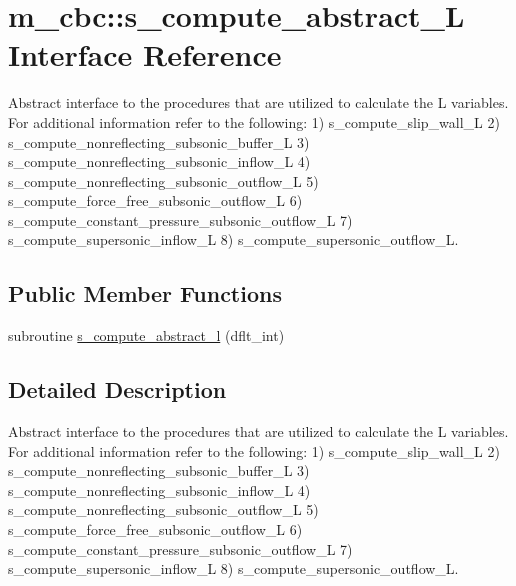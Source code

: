 \hypertarget{interfacem__cbc_1_1s__compute__abstract___l}{}\section{m\+\_\+cbc\+:\+:s\+\_\+compute\+\_\+abstract\+\_\+L Interface Reference}
\label{interfacem__cbc_1_1s__compute__abstract___l}


Abstract interface to the procedures that are utilized to calculate the L variables. For additional information refer to the following\+: 1) s\+\_\+compute\+\_\+slip\+\_\+wall\+\_\+L 2) s\+\_\+compute\+\_\+nonreflecting\+\_\+subsonic\+\_\+buffer\+\_\+L 3) s\+\_\+compute\+\_\+nonreflecting\+\_\+subsonic\+\_\+inflow\+\_\+L 4) s\+\_\+compute\+\_\+nonreflecting\+\_\+subsonic\+\_\+outflow\+\_\+L 5) s\+\_\+compute\+\_\+force\+\_\+free\+\_\+subsonic\+\_\+outflow\+\_\+L 6) s\+\_\+compute\+\_\+constant\+\_\+pressure\+\_\+subsonic\+\_\+outflow\+\_\+L 7) s\+\_\+compute\+\_\+supersonic\+\_\+inflow\+\_\+L 8) s\+\_\+compute\+\_\+supersonic\+\_\+outflow\+\_\+L.  


\subsection*{Public Member Functions}
\begin{DoxyCompactItemize}
\item 
subroutine \hyperlink{interfacem__cbc_1_1s__compute__abstract___l_a0da994a6412d8725ee77753ebfcdbd86}{s\+\_\+compute\+\_\+abstract\+\_\+l} (dflt\+\_\+int)
\end{DoxyCompactItemize}


\subsection{Detailed Description}
Abstract interface to the procedures that are utilized to calculate the L variables. For additional information refer to the following\+: 1) s\+\_\+compute\+\_\+slip\+\_\+wall\+\_\+L 2) s\+\_\+compute\+\_\+nonreflecting\+\_\+subsonic\+\_\+buffer\+\_\+L 3) s\+\_\+compute\+\_\+nonreflecting\+\_\+subsonic\+\_\+inflow\+\_\+L 4) s\+\_\+compute\+\_\+nonreflecting\+\_\+subsonic\+\_\+outflow\+\_\+L 5) s\+\_\+compute\+\_\+force\+\_\+free\+\_\+subsonic\+\_\+outflow\+\_\+L 6) s\+\_\+compute\+\_\+constant\+\_\+pressure\+\_\+subsonic\+\_\+outflow\+\_\+L 7) s\+\_\+compute\+\_\+supersonic\+\_\+inflow\+\_\+L 8) s\+\_\+compute\+\_\+supersonic\+\_\+outflow\+\_\+L. 


